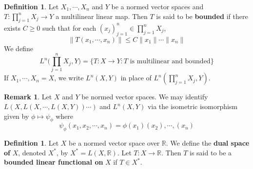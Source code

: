 \documentclass[notheorems]{beamer}
\theoremstyle{definition}
\newtheorem{defn}[definition]{Definition}
\theoremstyle{definition}
\newtheorem{rem}[definition]{Remark}
\newcommand{\R}{\mathbb{R}}
\begin{document}
	
	
	
	
	
	
	
	
	
	
	
	
	
	
	
	
	\begin{frame}
	
	\begin{defn}
		Let $X_1, \cdots, X_n$ and $Y$ be a normed vector spaces and $T:\prod\limits_{j=1}^n X_j \rightarrow Y$ a multilinear linear map. Then $T$ is said to be \textbf{bounded} if there exists $C \geq 0$ such that for each $(x_j)_{j=1}^n \in \prod\limits_{j=1}^n X_j$, $$\|T(x_1, \cdots, x_n) \|\leq C \|x_1 \| \cdots \|x_n\|$$ 
		We define $$L^n\bigg(\prod_{j=1}^n X_j,Y\bigg) = \{T:X \rightarrow Y: T \text{ is multilinear and bounded}\}$$ 
		If $X_1, \cdots, X_n = X$, we write $L^n(X,Y)$ in place of  $L^n(\prod_{j=1}^n X_j,Y)$.
	\end{defn}
	
	\end{frame}
	
	
	
	
	
	

	
	
	
	
	
	
	
	
	
	
	
	
	
	\begin{frame}
	
	\begin{rem}
	
	Let $X$ and $Y$ be normed vector spaces. We may identify $L(X, L(X, \cdots, L(X, Y)) \cdots)$ and $L^n(X, Y)$ via the isometric isomorphism given by $\phi \mapsto \psi_{\phi}$ where $$\psi_{\phi}(x_1, x_2, \cdots, x_n) = \phi(x_1)(x_2),\cdots,(x_n)$$ 
	\end{rem}

	\begin{defn}
	Let $X$ be a normed vector space over $\R$. We define the \textbf{dual space of} $X$, denoted $X^*$, by $X^* = L(X, \R)$. Let $T: X \rightarrow \R$. Then $T$ is said to be a \textbf{bounded linear functional on} $X$ if $T \in X^*$.
	\end{defn}
	
\end{frame}
\end{document}
